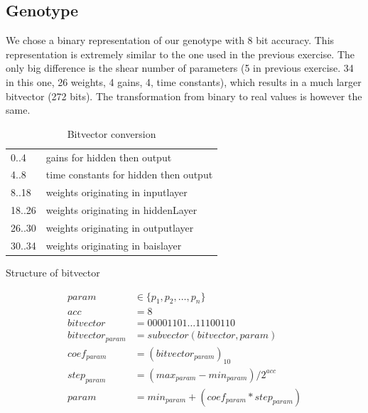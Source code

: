 \documentclass[10pt]{article}
\begin{document}
	\subsection{Genotype}
		We chose a binary representation of our genotype with 8 bit accuracy. This representation is extremely similar to the one used in the previous exercise. The only big difference is the shear number of parameters (5 in previous exercise. 34 in this one, 26 weights, 4 gains, 4, time constants), which results in a much larger bitvector (272 bits). The transformation from binary to real values is however the same. 
	\begin{table}
		\parbox{.45\linewidth}{
			\centering
			\begin{tabular}{ll}
				0..4 & gains for hidden then output\\
        4..8 & time constants for hidden then output\\
        8..18 & weights originating in inputlayer\\
				18..26 & weights originating in hiddenLayer\\
        26..30 & weights originating in outputlayer\\
				30..34 & weights originating in baislayer
			\end{tabular}
			\caption{Structure of bitvector}
		}
		\hfill
		\parbox{.45\linewidth}{
			\centering
			\begin{align}
				param &\in \{p_1, p_2, \dots, p_n\}\nonumber\\
				acc &= 8\nonumber\\
				bitvector &= 00001101\dots11100110\nonumber\\
				bitvector_{param} &= subvector(bitvector, param)\nonumber\\
				coef_{param} &= (bitvector_{param})_{10}\nonumber\\
				step_{param} &= (max_{param}-min_{param})/2^{acc}\nonumber\\
				param &= min_{param}+(coef_{param}*step_{param})\nonumber
			\end{align}
			\caption{Bitvector conversion}
		}
	\end{table}
\end{document}
